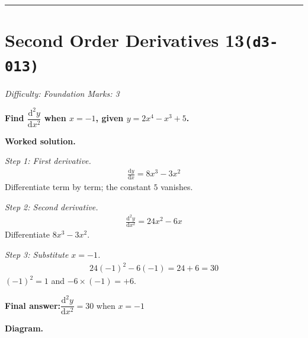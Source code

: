 \documentclass[11pt]{article}
\newcommand{\question}[1]{\par\medskip\noindent\textbf{#1}\par}
\begin{document}
\medskip\hrule

\section*{Second Order Derivatives 13\quad\small\texttt{(d3-013)}}
\textit{Difficulty: Foundation \quad\textbar\quad Marks: 3}

\question{Find \( \dfrac{\mathrm{d}^2y}{\mathrm{d}x^2} \) when \( x = -1 \), given \( y = 2x^4 - x^3 + 5 \).}

\textbf{Worked solution.}

\textit{Step 1: First derivative.}
\[\begin{gathered}
\frac{\mathrm{d}y}{\mathrm{d}x} = 8x^3 - 3x^2
\end{gathered}\]
Differentiate term by term; the constant \(5\) vanishes.

\textit{Step 2: Second derivative.}
\[\begin{gathered}
\frac{\mathrm{d}^2y}{\mathrm{d}x^2} = 24x^2 - 6x
\end{gathered}\]
Differentiate \(8x^3 - 3x^2\).

\textit{Step 3: Substitute \( x = -1 \).}
\[\begin{gathered}
24(-1)^2 - 6(-1) = 24 + 6 = 30
\end{gathered}\]
\( (-1)^2 = 1 \) and \( -6 \times (-1) = +6 \).

\begin{answerbox}
\textbf{Final answer:}\quad \(\displaystyle  \dfrac{\mathrm{d}^2y}{\mathrm{d}x^2} = 30 \) when \(\displaystyle  x = -1 \)
\end{answerbox}
\textbf{Diagram.}
\end{document}
